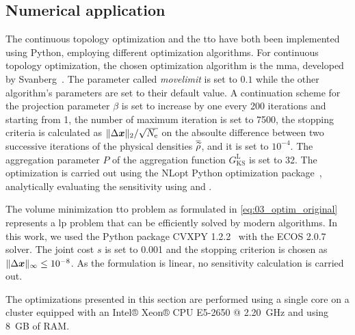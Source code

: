 \subsection{Numerical application} \label{sec:03_applications}
The continuous topology optimization and the \gls{tto} have both been implemented using Python, employing different optimization algorithms. For continuous topology optimization, the chosen optimization algorithm is the \gls{mma}, developed by Svanberg~. The parameter called \textit{movelimit} is set to $0.1$ while the other algorithm's parameters are set to their default value. A continuation scheme for the projection parameter $\beta$ is set to increase by one every 200 iterations and starting from 1, the number of maximum iteration is set to 7500, the stopping criteria is calculated as $\Vert \Delta \bm{x} \Vert_2 / \sqrt{N_\text{e}}$ \cite{ferrari_new_2020} on the absoulte difference between two successive iterations of the physical densities $\overline{\widetilde{\rho}}$, and it is set to $10^{-4}$. The aggregation parameter $P$ of the aggregation function $G_{\text{KS}}^\text{L}$ is set to 32. The optimization is carried out using the NLopt Python optimization package~, analytically evaluating the sensitivity using  and .

The volume minimization \gls{tto} problem as formulated in \ref{eq:03_optim_original} represents a \gls{lp} problem that can be efficiently solved by modern algorithms. In this work, we used the Python package CVXPY 1.2.2~ with the ECOS 2.0.7~ solver. The joint cost $s$ is set to 0.001 and the stopping criterion is chosen as $\lVert\Delta \bm{x}\rVert_\infty \leq 10^{-8}$. As the formulation is linear, no sensitivity calculation is carried out.

The optimizations presented in this section are performed using a single core on a cluster equipped with an Intel® Xeon® CPU E5-2650 @ \qty{2.20}{GHz} and using \qty{8}{GB} of RAM.

